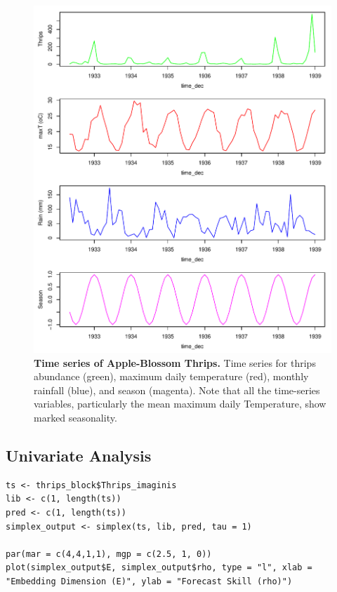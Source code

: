 \begin{figure}[!ht]
\begin{center}\includegraphics[width=\maxwidth{\textwidth}]{fig_redm_13.pdf}\end{center}
\caption[Time series of Apple-Blossom Thrips.]{\textbf{Time series of Apple-Blossom Thrips.}\newline
Time series for thrips abundance (green), maximum daily temperature (red), monthly rainfall (blue), and season (magenta). Note that all the time-series variables, particularly the mean maximum daily Temperature, show marked seasonality.}
\end{figure}

\subsection{Univariate Analysis}

\begin{lstlisting}
ts <- thrips_block$Thrips_imaginis
lib <- c(1, length(ts))
pred <- c(1, length(ts))
simplex_output <- simplex(ts, lib, pred, tau = 1)

par(mar = c(4,4,1,1), mgp = c(2.5, 1, 0))
plot(simplex_output$E, simplex_output$rho, type = "l", xlab = "Embedding Dimension (E)", ylab = "Forecast Skill (rho)")
\end{lstlisting}

